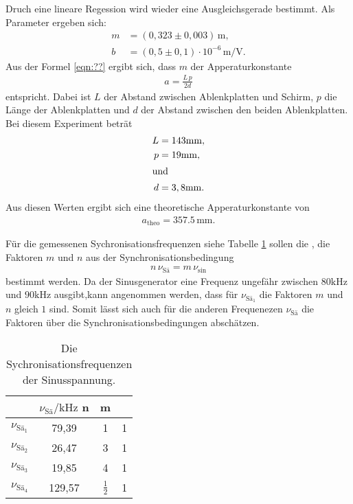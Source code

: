 Druch eine lineare Regession wird wieder eine Ausgleichsgerade bestimmt.
Als Parameter ergeben sich:
\begin{align*}
  m&=(0,323\pm0,003)\,\si{\meter},\\
  b&=(0,5\pm0,1)\cdot10^{-6}\,\si{\meter\per\volt}.
\end{align*}
Aus der Formel
\eqref{eqn:??} ergibt sich, dass $m$ der Apperaturkonstante
\begin{align*}
  a=\frac{L\,p}{2d}
\end{align*}
entspricht.
Dabei ist $L$ der Abstand zwischen Ablenkplatten und Schirm,
$p$ die Länge der Ablenkplatten und $d$ der Abstand zwischen den
beiden Ablenkplatten.
Bei diesem Experiment beträt
\begin{align*}
  L&=143\si{\milli\meter},\\
  p&=19\si{\milli\meter},\\
\shortintertext{und}
  d&=3,8\si{\milli\meter}.
\end{align*}
Aus diesen Werten ergibt sich eine theoretische Apperaturkonstante
von
\begin{align*}
  a_\mathrm{theo}=357.5\,\si{\milli\meter}.
\end{align*}

Für die gemessenen Sychronisationsfrequenzen siehe Tabelle \ref{tab:syn}
sollen die ,
die Faktoren $m$ und $n$
aus der Synchronisationsbedingung
\begin{align*}
  n\,\nu_\mathrm{Sä}=m\,\nu_\mathrm{sin}
\end{align*}
bestimmt werden.
Da der Sinusgenerator eine Frequenz
ungefähr zwischen $80\si{\kilo\hertz}$ und $90\si{\kilo\hertz}$
ausgibt,kann angenommen werden, dass für $\nu_\mathrm{Sä_1}$ die Faktoren $m$ und $n$
gleich $1$ sind. Somit lässt sich auch für die anderen Frequenezen $\nu_\mathrm{Sä}$ die Faktoren über
die Synchronisationsbedingungen abschätzen.

\begin{table}
  \centering
  \caption{Die Sychronisationsfrequenzen der Sinusspannung.}
  \label{tab:syn}
  \begin{tabular}{c c c c}
\toprule  %
 &  $ \nu_\mathrm{Sä} / \si{\kilo\hertz} $  n & m \\
\midrule
$\nu_\mathrm{Sä_1}$ & 79,39  & 1 & 1 \\
$\nu_\mathrm{Sä_2}$ & 26,47  & 3 & 1 \\
$\nu_\mathrm{Sä_3}$ & 19,85  & 4 & 1 \\
$\nu_\mathrm{Sä_4}$ & 129,57 & $\frac{1}{2}$ & 1\\
\bottomrule
\end{tabular}
\end{table}
\FloatBarrier

